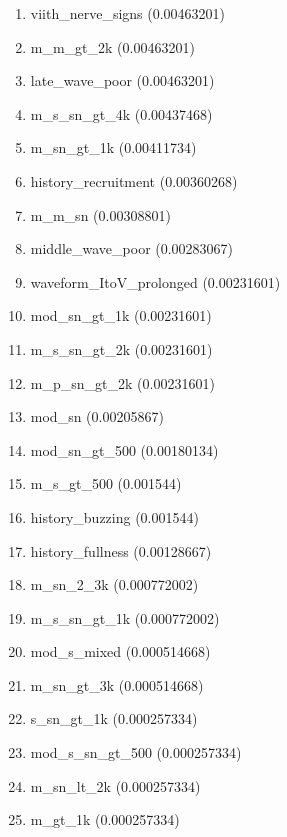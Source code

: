 \begin{enumerate}
\item viith\_nerve\_signs (0.00463201)
\item m\_m\_gt\_2k (0.00463201)
\item late\_wave\_poor (0.00463201)
\item m\_s\_sn\_gt\_4k (0.00437468)
\item m\_sn\_gt\_1k (0.00411734)
\item history\_recruitment (0.00360268)
\item m\_m\_sn (0.00308801)
\item middle\_wave\_poor (0.00283067)
\item waveform\_ItoV\_prolonged (0.00231601)
\item mod\_sn\_gt\_1k (0.00231601)
\item m\_s\_sn\_gt\_2k (0.00231601)
\item m\_p\_sn\_gt\_2k (0.00231601)
\item mod\_sn (0.00205867)
\item mod\_sn\_gt\_500 (0.00180134)
\item m\_s\_gt\_500 (0.001544)
\item history\_buzzing (0.001544)
\item history\_fullness (0.00128667)
\item m\_sn\_2\_3k (0.000772002)
\item m\_s\_sn\_gt\_1k (0.000772002)
\item mod\_s\_mixed (0.000514668)
\item m\_sn\_gt\_3k (0.000514668)
\item s\_sn\_gt\_1k (0.000257334)
\item mod\_s\_sn\_gt\_500 (0.000257334)
\item m\_sn\_lt\_2k (0.000257334)
\item m\_gt\_1k (0.000257334)
\end{enumerate}